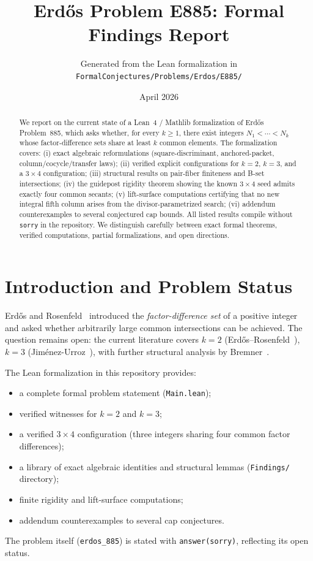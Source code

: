 \documentclass[11pt,a4paper]{article}
\title{Erd\H{o}s Problem E885: Formal Findings Report}
\author{Generated from the Lean formalization in\\
\texttt{FormalConjectures/Problems/Erdos/E885/}}
\date{April 2026}
\theoremstyle{definition}
\theoremstyle{remark}
\begin{document}
\maketitle

\begin{abstract}
We report on the current state of a Lean~4 / Mathlib formalization
of Erd\H{o}s Problem~885, which asks whether, for every $k\ge 1$,
there exist integers $N_1<\cdots<N_k$ whose factor-difference sets
share at least $k$ common elements.
The formalization covers:
(i) exact algebraic reformulations (square-discriminant, anchored-packet,
column/cocycle/transfer laws);
(ii) verified explicit configurations for $k=2$, $k=3$, and a $3\times 4$
configuration;
(iii) structural results on pair-fiber finiteness and B-set intersections;
(iv) the guidepost rigidity theorem showing the known $3\times 4$ seed
admits exactly four common secants;
(v) lift-surface computations certifying that no new integral fifth
column arises from the divisor-parametrized search;
(vi) addendum counterexamples to several conjectured cap bounds.
All listed results compile without \texttt{sorry} in the repository.
We distinguish carefully between exact formal theorems, verified
computations, partial formalizations, and open directions.
\end{abstract}

\section{Introduction and Problem Status}\label{sec:intro}

Erd\H{o}s and Rosenfeld~\cite{ErRo97} introduced the \emph{factor-difference
set} of a positive integer and asked whether arbitrarily large common
intersections can be achieved.  The question remains open:
the current literature covers $k=2$ (Erd\H{o}s--Rosenfeld~\cite{ErRo97}),
$k=3$ (Jim\'enez-Urroz~\cite{Ji99}), with further structural analysis
by Bremner~\cite{Br19}.

The Lean formalization in this repository provides:
\begin{itemize}[nosep]
\item a complete formal problem statement (\texttt{Main.lean});
\item verified witnesses for $k=2$ and $k=3$;
\item a verified $3\times 4$ configuration (three integers sharing four
      common factor differences);
\item a library of exact algebraic identities and structural lemmas
      (\texttt{Findings/} directory);
\item finite rigidity and lift-surface computations;
\item addendum counterexamples to several cap conjectures.
\end{itemize}
The problem itself (\texttt{erdos\_885}) is stated with
\texttt{answer(sorry)}, reflecting its open status.
\end{document}
